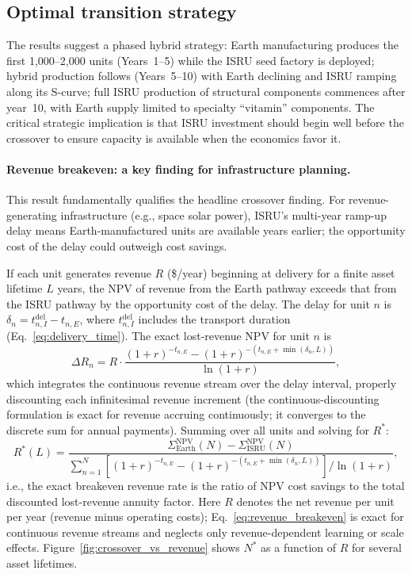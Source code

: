 \documentclass[preprint,12pt]{elsarticle}
\begin{document}
\subsection{Optimal transition strategy}

The results suggest a phased hybrid strategy: Earth manufacturing produces the first 1{,}000--2{,}000 units (Years~1--5) while the ISRU seed factory is deployed; hybrid production follows (Years~5--10) with Earth declining and ISRU ramping along its S-curve; full ISRU production of structural components commences after year~10, with Earth supply limited to specialty ``vitamin'' components. The critical strategic implication is that ISRU investment should begin well before the crossover to ensure capacity is available when the economics favor it.

\paragraph{Revenue breakeven: a key finding for infrastructure planning.} This result fundamentally qualifies the headline crossover finding. For revenue-generating infrastructure (e.g., space solar power), ISRU's multi-year ramp-up delay means Earth-manufactured units are available years earlier; the opportunity cost of the delay could outweigh cost savings.

If each unit generates revenue $R$ (\$/year) beginning at delivery for a finite asset lifetime $L$ years, the NPV of revenue from the Earth pathway exceeds that from the ISRU pathway by the opportunity cost of the delay. The delay for unit $n$ is $\delta_n = t_{n,I}^{\mathrm{del}} - t_{n,E}$, where $t_{n,I}^{\mathrm{del}}$ includes the transport duration (Eq.~\ref{eq:delivery_time}). The exact lost-revenue NPV for unit $n$ is
\begin{equation}
  \Delta R_n = R \cdot \frac{(1+r)^{-t_{n,E}} - (1+r)^{-(t_{n,E}+\min(\delta_n,L))}}{\ln(1+r)},
  \label{eq:exact_lost_revenue}
\end{equation}
which integrates the continuous revenue stream over the delay interval, properly discounting each infinitesimal revenue increment (the continuous-discounting formulation is exact for revenue accruing continuously; it converges to the discrete sum for annual payments). Summing over all units and solving for $R^*$:
\begin{equation}
  R^*(L) = \frac{\Sigma_{\mathrm{Earth}}^{\mathrm{NPV}}(N) - \Sigma_{\mathrm{ISRU}}^{\mathrm{NPV}}(N)}{\sum_{n=1}^{N} \left[(1+r)^{-t_{n,E}} - (1+r)^{-(t_{n,E}+\min(\delta_n,L))}\right] / \ln(1+r)},
  \label{eq:revenue_breakeven}
\end{equation}
i.e., the exact breakeven revenue rate is the ratio of NPV cost savings to the total discounted lost-revenue annuity factor. Here $R$ denotes the net revenue per unit per year (revenue minus operating costs); Eq.~\ref{eq:revenue_breakeven} is exact for continuous revenue streams and neglects only revenue-dependent learning or scale effects. Figure~\ref{fig:crossover_vs_revenue} shows $N^*$ as a function of $R$ for several asset lifetimes.
\end{document}
